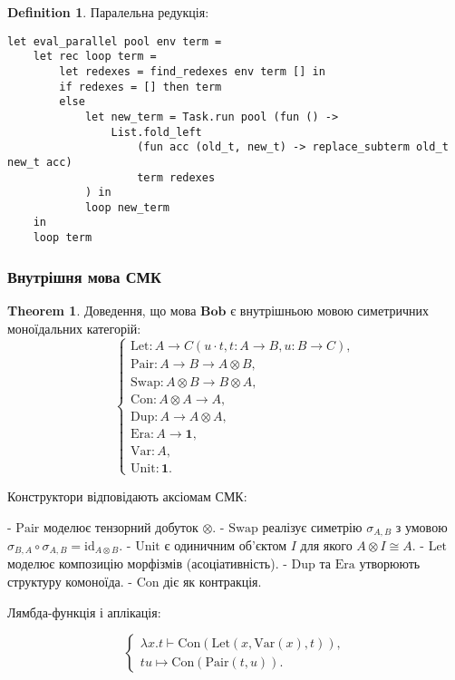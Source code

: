 \documentclass{article}
\theoremstyle{definition}
\newtheorem{theorem}{Theorem}
\newtheorem{definition}{Definition}
\begin{document}
\begin{definition}
Паралельна редукція:
\begin{lstlisting}[mathescape=true]
let eval_parallel pool env term =
    let rec loop term =
        let redexes = find_redexes env term [] in
        if redexes = [] then term
        else
            let new_term = Task.run pool (fun () ->
                List.fold_left
                    (fun acc (old_t, new_t) -> replace_subterm old_t new_t acc)
                    term redexes
            ) in
            loop new_term
    in
    loop term
\end{lstlisting}
\end{definition}

\subsubsection{Внутрішня мова СМК}

\begin{theorem}
Доведення, що мова $\mathbf{Bob}$ є внутрішньою мовою симетричних моноїдальних категорій:
\[
\begin{cases}
   \mathrm{Let} : A \to C (u \cdot t, t: A \to B, u: B \to C), \\
   \mathrm{Pair} : A \rightarrow B \rightarrow A \otimes B, \\
   \mathrm{Swap} : A \otimes B \rightarrow B \otimes A, \\
   \mathrm{Con} : A \otimes A \rightarrow A, \\
   \mathrm{Dup} : A \rightarrow A \otimes A, \\
   \mathrm{Era} : A \rightarrow \mathbf{1}, \\
   \mathrm{Var} : A, \\
   \mathrm{Unit} : \mathbf{1}.
\end{cases}
\]
\end{theorem}

Конструктори відповідають аксіомам СМК:

- $\mathrm{Pair}$ моделює тензорний добуток $\otimes$.
- $\mathrm{Swap}$ реалізує симетрію $\sigma_{A,B}$ з умовою $\sigma_{B,A} \circ \sigma_{A,B} = \mathrm{id}_{A \otimes B}$.
- $\mathrm{Unit}$ є одиничним об'єктом $I$ для якого $A \otimes I \cong A$.
- $\mathrm{Let}$ моделює композицію морфізмів (асоціативність).
- $\mathrm{Dup}$ та $\mathrm{Era}$ утворюють структуру комоноїда.
- $\mathrm{Con}$ діє як контракція.

Лямбда-функція і аплікація:

\[
\begin{cases}
  \lambda x.t \vdash \mathrm{Con}(\mathrm{Let}(x,\mathrm{Var}(x),t)), \\
  t u \mapsto \mathrm{Con}(\mathrm{Pair}(t,u)).
\end{cases}
\]
\end{document}
